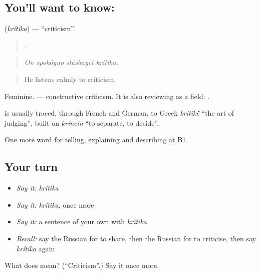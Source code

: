 \subsection*{You'll want to know: }
\textbf{} (\emph{krítika}) — \textquotedblleft{}criticism\textquotedblright{}.

\begin{quote}
   .
\end{quote}

\begin{quote}
\emph{On spokóyno slúshayet krítiku.}
\end{quote}

\begin{quote}
He listens calmly to criticism.
\end{quote}

Feminine. \emph{ } — constructive criticism. It is also reviewing as a field: \emph{ }.

\begin{cousinweb}
\textbf{} is usually traced, through French and German, to Greek \emph{kritik\'{\={e}}} \textquotedblleft{}the art of judging\textquotedblright{}, built on \emph{krínein} \textquotedblleft{}to separate, to decide\textquotedblright{}.
\end{cousinweb}

\begin{grammarlens}[title={What you've built}]
One more word for telling, explaining and describing at B1.
\end{grammarlens}

\subsection*{Your turn}
\begin{itemize}
\raggedright
  \item \emph{Say it:} \emph{krítika}
  \item \emph{Say it:} \emph{krítika}, once more
  \item \emph{Say it:} a sentence of your own with \emph{krítika}
  \item \emph{Recall:} say the Russian for to share, then the Russian for to criticise, then say \emph{krítika} again
\end{itemize}

\begin{tcolorbox}[breakable,colback=teal!4,colframe=teal!35!black,title={Before you move on}]
What does  mean? (\textquotedblleft{}Criticism\textquotedblright{}.) Say it once more.
\end{tcolorbox}

